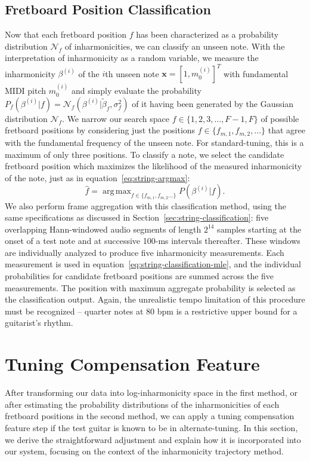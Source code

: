 \documentclass[12pt]{cmuthesis}
\DeclareMathOperator*{\argmax}{arg\,max}
\begin{document}
\subsection{Fretboard Position Classification}
Now that each fretboard position $f$ has been characterized as a probability distribution $\mathcal{N}_f$ of inharmonicities, we can classify an unseen note. With the interpretation of inharmonicity as a random variable, we measure the inharmonicity $\beta^{(i)}$ of the $i$th unseen note $\mathbf{x}=[1,m_0^{(i)}]^T$ with fundamental MIDI pitch $m_0^{(i)}$ and simply evaluate the probability $P_f(\beta^{(i)} | f) = \mathcal{N}_f(\beta^{(i)} | \tilde{\beta}_f,\sigma^2_f)$ of it having been generated by the Gaussian distribution $\mathcal{N}_f$. We narrow our search space $f \in \{1,2,3,...,F-1,F\}$ of possible fretboard positions by considering just the positions $f \in \{f_{m,1},f_{m,2},...\}$ that agree with the fundamental frequency of the unseen note. For standard-tuning, this is a maximum of only three positions. To classify a note, we select the candidate fretboard position which maximizes the likelihood of the measured inharmonicity of the note, just as in equation~\eqref{eq:string-argmax}:
\begin{equation}
\hat{f} = \argmax_{f\in\{f_{m,1},f_{m,2}...\}}P(\beta^{(i)} | f).
\label{eq:string-classification-mle}
\end{equation}
We also perform frame aggregation with this classification method, using the same specifications as discussed in Section~\ref{sec:string-classification}: five overlapping Hann-windowed audio segments of length $2^{14}$ samples starting at the onset of a test note and at successive 100-ms intervals thereafter. These windows are individually analyzed to produce five inharmonicity measurements. Each measurement is used in equation~\eqref{eq:string-classification-mle}, and the individual probabilities for candidate fretboard positions are summed across the five measurements. The position with maximum aggregate probability is selected as the classification output. Again, the unrealistic tempo limitation of this procedure must be recognized -- quarter notes at 80 bpm is a restrictive upper bound for a guitarist's rhythm.

\section{Tuning Compensation Feature}
After transforming our data into log-inharmonicity space in the first method, or after estimating the probability distributions of the inharmonicities of each fretboard positions in the second method, we can apply a tuning compensation feature step if the test guitar is known to be in alternate-tuning. In this section, we derive the straightforward adjustment and explain how it is incorporated into our system, focusing on the context of the inharmonicity trajectory method.
\end{document}
